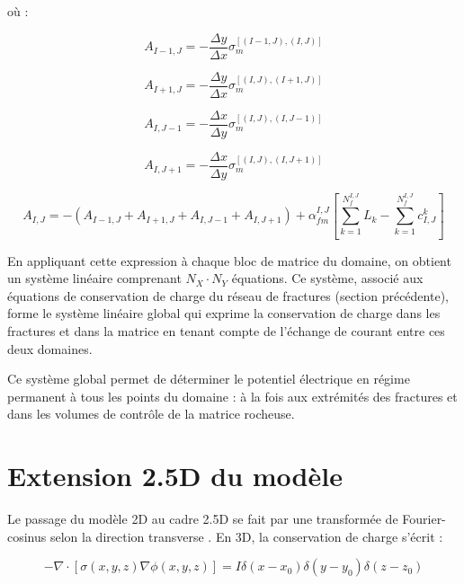 où :

\begin{equation}
A_{I-1,J} = -\frac{\Delta y}{\Delta x} \sigma_m^{[(I-1,J),(I,J)]}
\label{eq:AI-1J}
\end{equation}

\begin{equation}
A_{I+1,J} = -\frac{\Delta y}{\Delta x} \sigma_m^{[(I,J),(I+1,J)]}
\label{eq:AI+1J}
\end{equation}

\begin{equation}
A_{I,J-1} = -\frac{\Delta x}{\Delta y} \sigma_m^{[(I,J),(I,J-1)]}
\label{eq:AIJ-1}
\end{equation}

\begin{equation}
A_{I,J+1} = -\frac{\Delta x}{\Delta y} \sigma_m^{[(I,J),(I,J+1)]}
\label{eq:AIJ+1}
\end{equation}

\begin{equation}
A_{I,J} = -(A_{I-1,J} + A_{I+1,J} + A_{I,J-1} + A_{I,J+1}) + \alpha_{fm}^{I,J} \left[\sum_{k=1}^{N_f^{I,J}} L_k - \sum_{k=1}^{N_f^{I,J}} c_{I,J}^k\right]
\label{eq:AIJ}
\end{equation}

En appliquant cette expression à chaque bloc de matrice du domaine, on obtient un système linéaire comprenant $N_X \cdot N_Y$ équations. Ce système, associé aux équations de conservation de charge du réseau de fractures (section précédente), forme le système linéaire global qui exprime la conservation de charge dans les fractures et dans la matrice en tenant compte de l'échange de courant entre ces deux domaines.

Ce système global permet de déterminer le potentiel électrique en régime permanent à tous les points du domaine : à la fois aux extrémités des fractures et dans les volumes de contrôle de la matrice rocheuse.

\section{Extension 2.5D du modèle}

Le passage du modèle 2D au cadre 2.5D se fait par une transformée de Fourier-cosinus selon la direction transverse \parencite{Caballero2017}. En 3D, la conservation de charge s'écrit :

\begin{equation}
-\nabla \cdot [\sigma(x,y,z) \nabla \phi(x,y,z)] = I \delta(x-x_0)\delta(y-y_0)\delta(z-z_0)
\end{equation}


